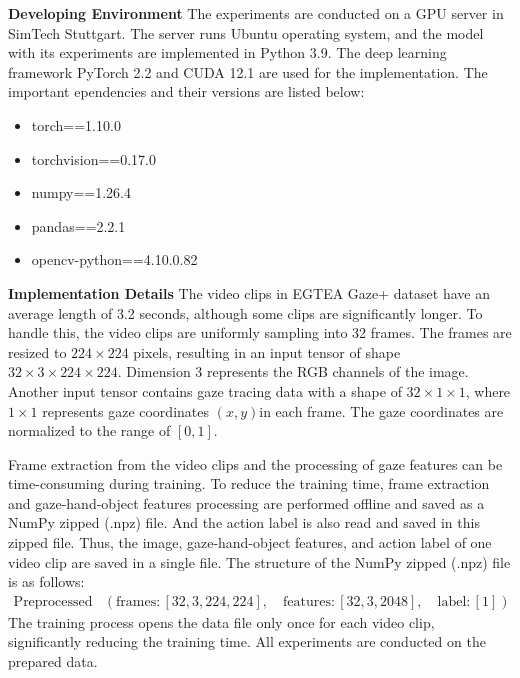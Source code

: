 \textbf{Developing Environment} The experiments are conducted on a GPU server in SimTech Stuttgart. The server runs Ubuntu operating system, and the model with its experiments are implemented in Python 3.9. The deep learning framework PyTorch 2.2 and CUDA 12.1 are used for the implementation.
The important ependencies and their versions are listed below:
\begin{itemize}
    \item torch==1.10.0
    \item torchvision==0.17.0
    \item numpy==1.26.4
    \item pandas==2.2.1
    \item opencv-python==4.10.0.82 
\end{itemize}

\textbf{Implementation Details} The video clips in  EGTEA Gaze+ dataset have an average length of 3.2 seconds, although some clips are significantly longer. To handle this, the video clips are uniformly sampling into 32 frames. The frames are resized to $224 \times 224$ pixels, resulting in an input tensor of shape $32 \times 3 \times 224 \times 224$. Dimension 3 represents the RGB channels of the image. Another input tensor contains gaze tracing data with a shape of $32 \times 1 \times 1$, where $1 \times 1$ represents gaze coordinates $(x,y)$in each frame. The gaze coordinates are normalized to the range of $[0, 1]$. 

Frame extraction from the video clips and the processing of gaze features can be time-consuming during training. To reduce the training time, frame extraction and gaze-hand-object features processing are performed offline and saved as a NumPy zipped (.npz) file. And the action label is also read and saved in this zipped file. Thus, the image, gaze-hand-object features, and action label of one video clip are saved in a single file. The structure of the NumPy zipped (.npz) file is as follows:
\begin{align*}
    \text{Preprocessed Data:} & (\text{frames}: [32, 3, 224, 224], \quad \text{features}: [32, 3, 2048], \quad \text{label}: [1])
\end{align*}
The training process opens the data file only once for each video clip, significantly reducing the training time. All experiments are conducted on the prepared data.

